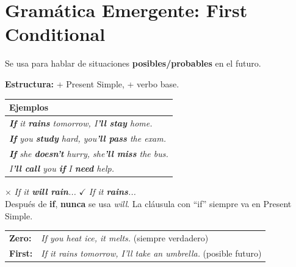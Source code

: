 \documentclass[12pt,a4paper]{article}
\begin{document}
\section{Gramática Emergente: First Conditional}

\begin{cajagrammar}
Se usa para hablar de situaciones \textbf{posibles/probables} en el futuro.

\medskip
\textbf{Estructura:}  + Present Simple,  + verbo base.

\begin{tabularx}{\textwidth}{@{} X @{}}
\toprule
\textbf{Ejemplos} \\
\midrule
\textit{\textbf{If} it \textbf{rains} tomorrow, I\textbf{'ll stay} home.} \\
\textit{\textbf{If} you \textbf{study} hard, you\textbf{'ll pass} the exam.} \\
\textit{\textbf{If} she \textbf{doesn't} hurry, she\textbf{'ll miss} the bus.} \\
\textit{I\textbf{'ll call} you \textbf{if} I \textbf{need} help.} \\
\bottomrule
\end{tabularx}

\medskip
\begin{cajaejemplo}
$\times$ \textit{If it \textbf{will rain}...} \quad $\checkmark$ \textit{If it \textbf{rains}...}\\
Después de \textbf{if}, \textbf{nunca} se usa \textit{will}. La cláusula con ``if'' siempre va en Present Simple.
\end{cajaejemplo}

\medskip
\begin{cajaejemplo}
\begin{tabularx}{\textwidth}{@{} l X @{}}
\textbf{Zero:} & \textit{If you heat ice, it melts.} (siempre verdadero) \\
\textbf{First:} & \textit{If it rains tomorrow, I'll take an umbrella.} (posible futuro) \\
\end{tabularx}
\end{cajaejemplo}
\end{cajagrammar}

\end{document}

